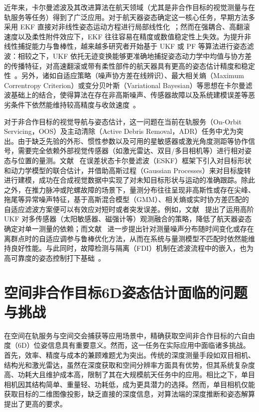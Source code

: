 近年来，卡尔曼滤波及其改进算法在航天领域（尤其是非合作目标的视觉测量与在轨服务等任务）得到了广泛应用。对于航天器姿态确定这一核心任务，早期方法多采用 EKF 直接对非线性姿态运动方程进行局部线性化~\cite{Lefferts1982,Shuster1981}；然而在强耦合、高翻滚速度以及柔性附件效应下，EKF 往往容易在精度或数值稳定性上失效。为提升非线性捕捉能力与鲁棒性，越来越多研究者开始基于 UKF 或 PF 等算法进行姿态滤波：相较之下，UKF 依托无迹变换能够更准确地捕捉姿态动力学中均值与协方差的传播特征，对高速翻滚或带有柔性部件的航天器具有更高的姿态估计精度和稳定性~\cite{NJHK202201006,1024861534.nh}。另外，诸如自适应策略（噪声协方差在线辨识）、最大相关熵（Maximum Correntropy Criterion）或变分贝叶斯（Variational Bayesian）等思想在卡尔曼滤波基础上的结合，使得算法在存在非高斯噪声、传感器故障以及系统建模误差等恶劣条件下依然能维持较高精度与收敛速度~\cite{GXJM202103017,9272767,qiu2023novel,POURTAKDOUST2022134}。

对于非合作目标的视觉导航与姿态估计，这一问题在当前在轨服务（On-Orbit Servicing，OOS）及主动清除（Active Debris Removal，ADR）任务中尤为突出。由于缺乏先验的外形、惯性参数以及可用的星敏感器或激光角度测距等协作信号，需要完全依赖外部视觉传感器（如激光雷达、双目/多目相机等）进行相对姿态与位置的量测。文献~\cite{BARBIER2023144} 在误差状态卡尔曼滤波（ESKF）框架下引入对目标形状和动力学模型的联合估计，并借助高斯过程（Gaussian Processes）来对目标旋转进行建模，成功在合成视觉数据中实现了对未知目标形状与运动的准确跟踪。除此之外，在推力脉冲或陀螺故障的场景下，量测分布往往呈现非高斯性或存在尖峰、拖尾等异常噪声特征，基于高斯混合模型（GMM）、相关熵或实时协方差匹配的自适应滤波方案便可以有效应对短时或者突发误差。例如，文献~\cite{2022HO-UKF} 提出了运用高阶 UKF 对多传感器（太阳敏感器、磁强计等）观测融合的策略，降低了航天器姿态确定对单一测量的依赖；而文献~\cite{kim2023gmm,Xiao_2024,AMCCKF_2023} 进一步提出针对测量噪声分布随时间变化或存在离群点时的自适应调参与鲁棒优化方法，从而在系统与量测模型不匹配时依然能维持良好性能。与此同时，故障检测与隔离（FDI）机制在滤波流程中的嵌入，也为高可靠度的姿态控制打下基础~\cite{POURTAKDOUST2022134}。


\section{空间非合作目标6D姿态估计面临的问题与挑战}
\label{sec:problems_challenges}

在空间在轨服务与空间交会捕获等应用场景中，精确获取空间非合作目标的六自由度（6D）位姿信息具有重要意义。然而，这一任务在实际应用中面临诸多挑战。首先，效率、精度与成本的兼顾难题尤为突出。传统的深度测量手段如双目相机、结构光和激光雷达，虽然在深度获取和空间分辨率方面具有优势，但其系统复杂度高、功耗大且维护成本高，限制了其在大规模航天任务中的应用。相比之下，单目相机因其结构简单、重量轻、功耗低，成为更具潜力的选择。然而，单目相机仅能获取目标的二维图像投影，缺乏直接的深度信息，对算法端的深度推断和姿态解算提出了更高的要求。

